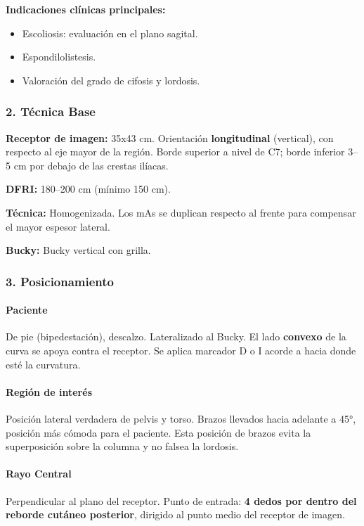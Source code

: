 	\textbf{Indicaciones clínicas principales:}
	\begin{itemize}
		\item Escoliosis: evaluación en el plano sagital.
		\item Espondilolistesis.
		\item Valoración del grado de cifosis y lordosis.
	\end{itemize}
	
	\subsubsection*{2. Técnica Base}
	
	\textbf{Receptor de imagen:} 35x43 cm. Orientación \textbf{longitudinal} (vertical), con respecto al eje mayor de la región. Borde superior a nivel de C7; borde inferior 3--5 cm por debajo de las crestas ilíacas.
	
	\textbf{DFRI:} 180--200 cm (mínimo 150 cm).
	
	\textbf{Técnica:} Homogenizada. Los mAs se duplican respecto al frente para compensar el mayor espesor lateral.
	
	\textbf{Bucky:} Bucky vertical con grilla.
	
	\subsubsection*{3. Posicionamiento}
	
	\paragraph{Paciente}
	De pie (bipedestación), descalzo. Lateralizado al Bucky. El lado \textbf{convexo} de la curva se apoya contra el receptor. Se aplica marcador D o I acorde a hacia donde esté la curvatura.
	
	\paragraph{Región de interés}
	Posición lateral verdadera de pelvis y torso. Brazos llevados hacia adelante a 45°, posición más cómoda para el paciente. Esta posición de brazos evita la superposición sobre la columna y no falsea la lordosis.
	
	\paragraph{Rayo Central}
	Perpendicular al plano del receptor. Punto de entrada: \textbf{4 dedos por dentro del reborde cutáneo posterior}, dirigido al punto medio del receptor de imagen.
	
